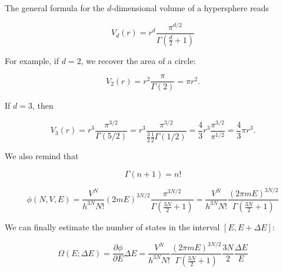 \documentclass[12pt,a4paper]{report}
\newcommand{\esp}{\vspace{0.5cm}}
\begin{document}
	\esp
	
	\begin{nota}
		The general formula for the $d$-dimensional volume of a hypersphere reads
		
		\esp
		
		\begin{equation}
			V_d(r) = r^d \frac{\pi^{d/2}}{\Gamma\left(\frac{d}{2} + 1\right)} \tag{4.66}
		\end{equation}
		
		\esp
		
		\noindent For example, if $d = 2$, we recover the area of a circle:
		
		\esp
		
		\begin{equation}
			V_2(r) = r^2 \frac{\pi}{\Gamma(2)} = \pi r^2.
		\end{equation}
		
		\esp
		
		\noindent If $d = 3$, then
		
		\esp
		
		\begin{equation}
			V_3(r) = r^3 \frac{\pi^{3/2}}{\Gamma(5/2)} = r^3 \frac{\pi^{3/2}}{\frac{3}{2} \frac{1}{2} \Gamma(1/2)} = \frac{4}{3} r^3 \frac{\pi^{3/2}}{\pi^{1/2}} = \frac{4}{3} \pi r^3.
		\end{equation}
		
		\esp
		
		\noindent We also remind that
		
		\esp
		
		\begin{equation}
			\Gamma(n+1) = n!
		\end{equation}
	\end{nota}
	
	\esp
	
	\begin{equation}
		\phi(N,V,E) = \frac{V^N}{h^{3N} N!} (2mE)^{3N/2} \frac{\pi^{3N/2}}{\Gamma \left( \frac{3N}{2} + 1 \right)} = \frac{V^N}{h^{3N} N!} \frac{(2\pi mE)^{3N/2}}{\Gamma \left( \frac{3N}{2} + 1 \right)}
	\end{equation}
	
	\esp
	
	\noindent We can finally estimate the number of states in the interval $[E, E + \Delta E]$:
	
	\esp
	
	\begin{equation}
		\Omega(E; \Delta E) = \frac{\partial \phi}{\partial E} \Delta E = \frac{V^N}{h^{3N} N!} \frac{(2\pi mE)^{3N/2}}{\Gamma \left( \frac{3N}{2} + 1 \right)} \frac{3N}{2} \frac{\Delta E}{E}
	\end{equation}
	
\end{document}
